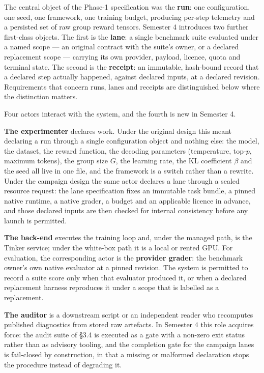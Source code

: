 \documentclass[12pt,a4paper]{report}
\begin{document}
The central object of the Phase-1 specification was the \textbf{run}:
one configuration, one seed, one framework, one training budget,
producing per-step telemetry and a persisted set of raw group reward
tensors. Semester 4 introduces two further first-class objects. The
first is the \textbf{lane}: a single benchmark suite evaluated under a
named scope --- an original contract with the suite's owner, or a
declared replacement scope --- carrying its own provider, payload,
licence, quota and terminal state. The second is the \textbf{receipt}:
an immutable, hash-bound record that a declared step actually happened,
against declared inputs, at a declared revision. Requirements that
concern runs, lanes and receipts are distinguished below where the
distinction matters.

Four actors interact with the system, and the fourth is new in Semester
4.

\textbf{The experimenter} declares work. Under the original design this
meant declaring a run through a single configuration object and nothing
else: the model, the dataset, the reward function, the decoding
parameters (temperature, top-\(p\), maximum tokens), the group size
\(G\), the learning rate, the KL coefficient \(\beta\) and the seed all
live in one file, and the framework is a switch rather than a rewrite.
Under the campaign design the same actor declares a lane through a
sealed resource request: the lane specification fixes an immutable task
bundle, a pinned native runtime, a native grader, a budget and an
applicable licence in advance, and those declared inputs are then
checked for internal consistency before any launch is permitted.

\textbf{The back-end} executes the training loop and, under the managed
path, is the Tinker service; under the white-box path it is a local or
rented GPU. For evaluation, the corresponding actor is the
\textbf{provider grader}: the benchmark owner's own native evaluator at
a pinned revision. The system is permitted to record a suite score only
when that evaluator produced it, or when a declared replacement harness
reproduces it under a scope that is labelled as a replacement.

\textbf{The auditor} is a downstream script or an independent reader who
recomputes published diagnostics from stored raw artefacts. In Semester
4 this role acquires force: the audit suite of §3.4 is executed as a
gate with a non-zero exit status rather than as advisory tooling, and
the completion gate for the campaign lanes is fail-closed by
construction, in that a missing or malformed declaration stops the
procedure instead of degrading it.
\end{document}

